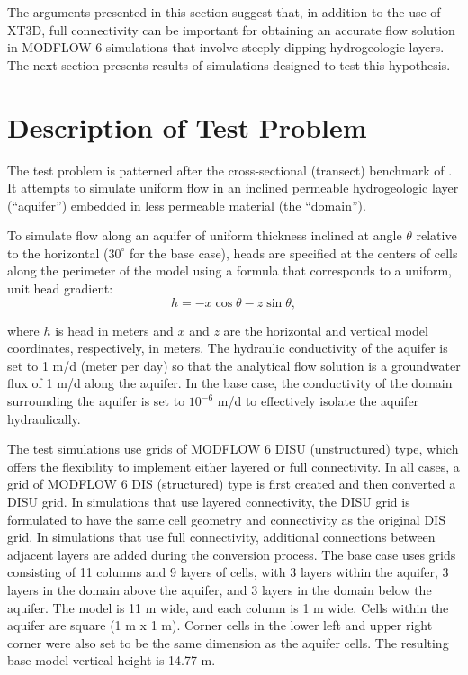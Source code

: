\documentclass{article}
\begin{document}
The arguments presented in this section suggest that, in addition to the use of XT3D, full connectivity can be important for obtaining an accurate flow solution in MODFLOW 6 simulations that involve steeply dipping hydrogeologic layers. The next section presents results of simulations designed to test this hypothesis.

\section{Description of Test Problem}

The test problem is patterned after the cross-sectional (transect) benchmark of \cite{bardot2023}. It attempts to simulate uniform flow in an inclined permeable hydrogeologic layer (``aquifer'') embedded in less permeable material (the ``domain'').

To simulate flow along an aquifer of uniform thickness inclined at angle $\theta$ relative to the horizontal ($30^{\circ}$ for the base case), heads are specified at the centers of cells along the perimeter of the model using a formula that corresponds to a uniform, unit head gradient:
\begin{equation}
\label{eqn:head_analyt_along}
h = - x \cos \theta - z \sin \theta,
\end{equation}

\noindent where $h$ is head in meters and $x$ and $z$ are the horizontal and vertical model coordinates, respectively, in meters. The hydraulic conductivity of the aquifer is set to 1 m/d (meter per day) so that the analytical flow solution is a groundwater flux of 1 m/d along the aquifer. In the base case, the conductivity of the domain surrounding the aquifer is set to $10^{-6}$ m/d to effectively isolate the aquifer hydraulically.

The test simulations use grids of MODFLOW 6 DISU (unstructured) type, which offers the flexibility to implement either layered or full connectivity. In all cases, a grid of MODFLOW 6 DIS (structured) type is first created and then converted a DISU grid. In simulations that use layered connectivity, the DISU grid is formulated to have the same cell geometry and connectivity as the original DIS grid. In simulations that use full connectivity, additional connections between adjacent layers are added during the conversion process. The base case uses grids consisting of 11 columns and 9 layers of cells, with 3 layers within the aquifer, 3 layers in the domain above the aquifer, and 3 layers in the domain below the aquifer.  The model is 11 m wide, and each column is 1 m wide. Cells within the aquifer are square (1 m x 1 m). Corner cells in the lower left and upper right corner were also set to be the same dimension as the aquifer cells. The resulting base model vertical height is 14.77 m.  
\end{document}
